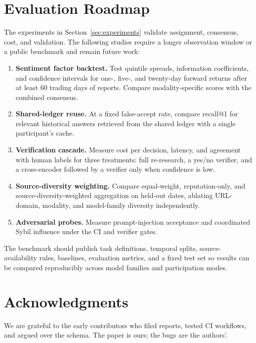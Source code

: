 \documentclass[10pt,twocolumn]{article}
\begin{document}
\appendix
\section{Evaluation Roadmap}
\label{app:evaluation}

The experiments in Section~\ref{sec:experiments} validate assignment, consensus, cost, and validation. The following studies require a longer observation window or a public benchmark and remain future work:

\begin{enumerate}[label=\arabic*.]
  \item \textbf{Sentiment factor backtest.} Test quintile spreads, information coefficients, and confidence intervals for one-, five-, and twenty-day forward returns after at least 60 trading days of reports. Compare modality-specific scores with the combined consensus.
  \item \textbf{Shared-ledger reuse.} At a fixed false-accept rate, compare recall@1 for relevant historical answers retrieved from the shared ledger with a single participant's cache.
  \item \textbf{Verification cascade.} Measure cost per decision, latency, and agreement with human labels for three treatments: full re-research, a yes/no verifier, and a cross-encoder followed by a verifier only when confidence is low.
  \item \textbf{Source-diversity weighting.} Compare equal-weight, reputation-only, and source-diversity-weighted aggregation on held-out dates, ablating URL-domain, modality, and model-family diversity independently.
  \item \textbf{Adversarial probes.} Measure prompt-injection acceptance and coordinated Sybil influence under the CI and verifier gates.
\end{enumerate}

The benchmark should publish task definitions, temporal splits, source-availability rules, baselines, evaluation metrics, and a fixed test set so results can be compared reproducibly across model families and participation modes.

\section*{Acknowledgments}
We are grateful to the early contributors who filed reports, tested CI workflows, and argued over the schema. The paper is ours; the bugs are the authors'.



\end{document}
